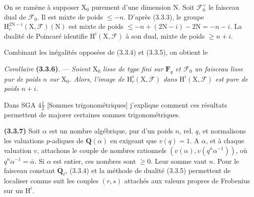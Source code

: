 \documentclass[11pt,leqno]{article}
\begin{document}
On se ramène à supposer \(\mathrm{X}_0\) purement d’une dimension \(\mathrm{N}\). Soit \(\mathscr{F}_0^\vee\) le faisceau dual de \(\mathscr{F}_0\). Il est mixte de poids \(\leq-n\). D’après (3.3.3), le groupe \(\mathrm{H}_c^{2\mathrm{N}-i}(\mathrm{X},\mathscr{F})(\mathrm{N})\) est mixte de poids \(\leq-n+(2\mathrm{N}-i)-2\mathrm{N}=-n-i\). La dualité de Poincaré identifie \(\mathrm{H}^i(\mathrm{X},\mathscr{F})\) à son dual, mixte de poids \(\geq n+i\).

Combinant les inégalités opposées de (3.3.4) et (3.3.5), on obtient le

\textit{Corollaire} \textbf{(3.3.6)}. — \textit{Soient \(\mathrm{X}_0\) lisse de type fini sur \(\mathbf{F}_q\) et \(\mathscr{F}_0\) un faisceau lisse pur de poids \(n\) sur \(\mathrm{X}_0\). Alors, l’image de \(\mathrm{H}_c^i(\mathrm{X},\mathscr{F})\) dans \(\mathrm{H}^i(\mathrm{X},\mathscr{F})\) est pure de poids \(n+i\).}

Dans SGA \(4\frac{1}{2}\) [Sommes trigonométriques] j’explique comment ces résultats permettent de majorer certaines sommes trigonométriques.

\textbf{(3.3.7)} Soit \(\alpha\) est un nombre algébrique, pur d’un poids \(n\), rel. \(q\), et normalisons les valuations \(p\)-adiques de \(\mathbf{Q}(\alpha)\) en exigeant que \(v(q)=1\). A \(\alpha\), et à chaque valuation \(v\), attachons le couple de nombres rationnels \((v(\alpha),v(q^n\alpha^{-1}))\), où \(q^n\alpha^{-1}=\bar{\alpha}\). Si \(\alpha\) est entier, ces nombres sont \(\geq0\). Leur somme vaut \(n\). Pour le faisceau constant \(\overline{\mathbf{Q}}_\ell\), (3.3.4) et la méthode de dualité (3.3.5) permettent de localiser comme suit les couples \((r,s)\) attachés aux valeurs propres de Frobenius sur un \(\mathrm{H}^i\).
\end{document}
